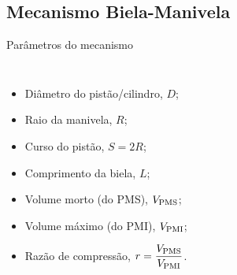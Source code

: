 \subsection{Mecanismo Biela-Manivela}

    \begin{frame}{Parâmetros do mecanismo}\vspace*{-2em}
        \begin{columns}
        \begin{itemize}
            \item<1-> \alert{Diâmetro} do pistão/cilindro, \alert{$D$};
            \item<2-> \alert{Raio} da manivela, \alert{$R$};
            \item<3-> \alert{Curso} do pistão, \alert{$S = 2R$};
            \item<4-> \alert{Comprimento} da biela, \alert{$L$};
            \item<5-> \alert{Volume} morto (do PMS), \alert{${V_{\mathrm{PMS}}}$};
            \item<6-> \alert{Volume} máximo (do PMI), \alert{${V_{\mathrm{PMI}}}$};
            \item<7-> \alert{Razão de compressão}, \alert{$r = \dfrac{{V_{\mathrm{PMS}}}}{{V_{\mathrm{PMI}}}}$}.
        \end{itemize}
        \begin{center}
        \end{center}
        \end{columns}
    \end{frame}

